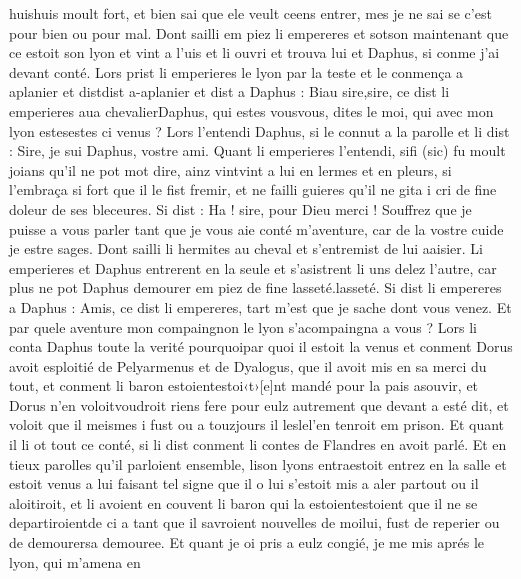 \documentclass{article}
\begin{document}
\begin{pages}
      huishuis moult fort, et bien sai que ele veult ceens entrer, 
   mes je ne sai se c’est pour bien ou pour mal. \pend
\pstart Dont sailli em piez 
   li empereres et sotson
   maintenant que ce estoit son lyon 
   et vint a l’uis et li ouvri et trouva lui et Daphus, si conme j’ai devant conté.
   Lors prist li emperieres le lyon
   par la teste et le conmença a aplanier et distdist a-aplanier et dist
   a Daphus :
   Biau sire,sire, ce 
      dist li emperieres
      aua 
      chevalierDaphus, qui estes 
      vousvous, dites le moi, qui avec 
   mon lyon estesestes ci venus ?
   Lors l’entendi Daphus, si le connut a la parolle et li dist :
   Sire, je sui Daphus, vostre ami.
   Quant li emperieres l’entendi, 
   sifi (sic) 
   fu moult joians qu'il ne pot mot dire, ainz 
   vintvint a lui en lermes et en pleurs, si l’embraça si fort que il le fist fremir,
   et ne failli guieres qu’il ne gita i cri de fine doleur de ses bleceures. Si dist :
   Ha ! sire, pour Dieu merci ! Souffrez que je puisse a vous parler tant que je vous aie conté m’aventure, 
               car de la vostre cuide je estre sages.
   Dont sailli li hermites au cheval et s’entremist de lui aaisier.
   Li emperieres et Daphus entrerent en 
   la seule et s’asistrent li uns delez l’autre, car plus ne pot Daphus demourer em piez de fine 
   lasseté.lasseté. Si dist li empereres a Daphus :
   Amis, ce 
      dist li empereres, tart m’est que je sache dont vous venez. 
      Et par quele aventure mon 
         compaingnon le lyon s’acompaingna a vous ?
   Lors li conta Daphus toute la verité 
      pourquoipar quoi il estoit la venus et conment 
      Dorus avoit esploitié de Pelyarmenus 
      et de Dyalogus, que il avoit mis en sa merci du tout, et conment li baron 
      estoientestoi‹t›[e]nt mandé 
      pour la pais asouvir, et Dorus n’en 
      voloitvoudroit riens fere pour eulz autrement que devant a esté dit, 
      et voloit que il meismes i fust ou a touzjours il
      leslel'en tenroit em prison. 
   Et quant il li ot tout ce conté, si li dist conment 
      li contes de Flandres en avoit parlé. 
      Et en tieux parolles qu’il parloient ensemble, 
      lison 
         lyons entraestoit entrez en la salle 
      et estoit venus a lui faisant tel signe que il o lui s’estoit mis a aler partout ou il 
      aloitiroit, et li avoient en couvent li baron qui la 
      estoientestoient que il ne se departiroientde ci a tant que il savroient nouvelles de moilui, 
      fust de reperier ou de demourersa demouree.
      Et quant je oi pris a eulz congié, je me mis aprés 
      le lyon, qui m’amena en 

\end{pages}
\end{document}
